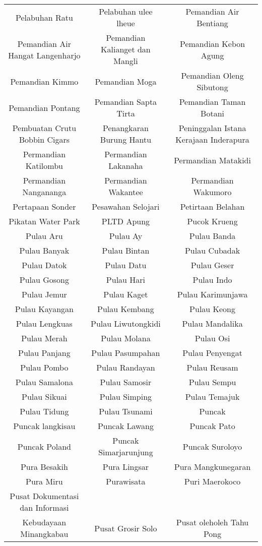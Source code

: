 \begin{table}[H]
\begin{tabular}{ c | c | c}
Pelabuhan Ratu & Pelabuhan ulee lheue & Pemandian Air Bentiang\\
Pemandian Air Hangat Langenharjo & Pemandian Kalianget dan Mangli & Pemandian Kebon Agung\\
Pemandian Kimmo & Pemandian Moga & Pemandian Oleng Sibutong\\
Pemandian Pontang & Pemandian Sapta Tirta & Pemandian Taman Botani\\
Pembuatan Crutu Bobbin Cigars & Penangkaran Burung Hantu & Peninggalan Istana Kerajaan Inderapura\\
Permandian Katilombu & Permandian Lakanaha & Permandian Matakidi\\
Permandian Nangananga & Permandian Wakantee & Permandian Wakumoro\\
Pertapaan Sonder & Pesawahan Selojari & Petirtaan Belahan\\
Pikatan Water Park & PLTD Apung & Pucok Krueng\\
Pulau Aru & Pulau Ay & Pulau Banda\\
Pulau Banyak & Pulau Bintan & Pulau Cubadak\\
Pulau Datok & Pulau Datu & Pulau Geser\\
Pulau Gosong & Pulau Hari & Pulau Indo\\
Pulau Jemur & Pulau Kaget & Pulau Karimunjawa\\
Pulau Kayangan & Pulau Kembang & Pulau Keong\\
Pulau Lengkuas & Pulau Liwutongkidi & Pulau Mandalika\\
Pulau Merah & Pulau Molana & Pulau Osi\\
Pulau Panjang & Pulau Pasumpahan & Pulau Penyengat\\
Pulau Pombo & Pulau Randayan & Pulau Reusam\\
Pulau Samalona & Pulau Samosir & Pulau Sempu\\
Pulau Sikuai & Pulau Simping & Pulau Temajuk\\
Pulau Tidung & Pulau Tsunami & Puncak\\
Puncak langkisau & Puncak Lawang & Puncak Pato\\
Puncak Poland & Puncak Simarjarunjung & Puncak Suroloyo\\
Pura Besakih & Pura Lingsar & Pura Mangkunegaran\\
Pura Miru & Purawisata & Puri Maerokoco\\
Pusat Dokumentasi dan Informasi & & \\
Kebudayaan Minangkabau & Pusat Grosir Solo & Pusat oleholeh Tahu Pong\\

\end{tabular}
\end{table}
